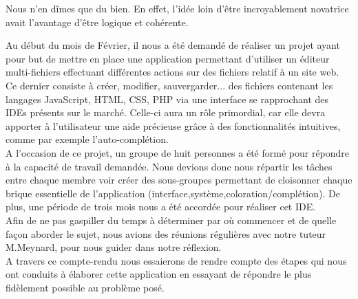 \documentclass[a4paper, 12pt]{report}
\begin{document}
\begin{chapter}
	Nous n'en dîmes que du bien. En effet, l'idée loin d'être incroyablement novatrice avait l'avantage d'être logique et cohérente.


	Au début du mois de Février, il nous a été demandé de réaliser un projet ayant pour but de mettre en place une application permettant
	d'utiliser un éditeur multi-fichiers effectuant différentes actions sur des fichiers relatif à un site web.\\
	Ce dernier consiste à créer, modifier, sauvergarder... des fichiers contenant les langages JavaScript, HTML, CSS, PHP via une interface se
	rapprochant des IDEs présents sur le marché. Celle-ci aura un rôle primordial, car elle devra apporter à l'utilisateur une aide précieuse grâce
	à des fonctionnalités intuitives, comme par exemple l'auto-complétion.\\
	A l'occasion de ce projet, un groupe de huit personnes a été formé pour répondre à la capacité de travail demandée. Nous devions donc nous 
	répartir les tâches entre chaque membre voir créer des sous-groupes permettant de cloisonner chaque brique essentielle de l'application 
	(interface,système,coloration/complétion). De plus, une période de trois mois nous a été accordée pour réaliser cet IDE.\\
	Afin de ne pas gaspiller du temps à déterminer par où commencer et de quelle façon aborder le sujet, nous avions des réunions régulières avec 
	notre tuteur M.Meynard, pour nous guider dans notre réflexion.\\
	A travers ce compte-rendu nous essaierons de rendre compte des étapes qui nous ont conduits à élaborer cette application en essayant de répondre 
	le plus fidèlement possible au problème posé.\\ 
	
	\end{chapter}
\end{document}
